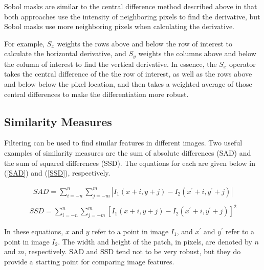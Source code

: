 \documentclass[twoside]{article}
\begin{document}
Sobol masks are similar to the central difference method described above in that both approaches use the intensity of neighboring pixels to find the derivative, but Sobol masks use more neighboring pixels when calculating the derivative.

For example, $S_x$ weights the rows above and below the row of interest to calculate the horizontal derivative, and $S_y$ weights the columns above and below the column of interest to find the vertical derivative. In essence, the $S_x$ operator takes the central difference of the the row of interest, as well as the rows above and below below the pixel location, and then takes a weighted average of those central differences to make the differentiation more robust.


\subsection{Similarity Measures}
Filtering can be used to find similar features in different images. Two useful examples of similarity measures are the sum of absolute differences (SAD) and the sum of squared differences (SSD). The equations for each are given below in (\ref{SAD}) and (\ref{SSD}), respectively.

\begin{equation}
  \label{SAD}
  \begin{aligned}
    SAD = \sum_{i=-n}^n \sum_{j=-m}^m |I_1(x+i,y+j)-I_2(x^\prime+i,y^\prime+j)|\\
  \end{aligned}
\end{equation}
\begin{equation}
  \label{SSD}
  \begin{aligned}
  SSD = \sum_{i=-n}^n \sum_{j=-m}^m [I_1(x+i,y+j)-I_2(x^\prime+i,y^\prime+j)]^2
  \end{aligned}
\end{equation}

In these equations, $x$ and $y$ refer to a point in image $I_1$, and $x^\prime$ and $y^\prime$ refer to a point in image $I_2$.
The width and height of the patch, in pixels, are denoted by $n$ and $m$, respectively. SAD and SSD tend not to be very robust, but they do provide a starting point for comparing image features.


\end{document}
